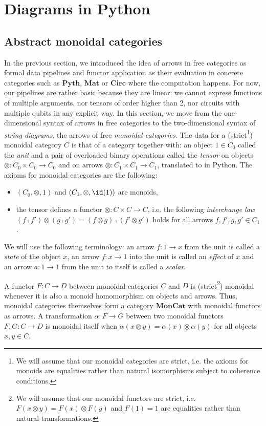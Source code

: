 
\section{Diagrams in Python}

\subsection{Abstract monoidal categories}

In the previous section, we introduced the idea of arrows in free categories as formal data pipelines and functor application as their evaluation in concrete categories such as $\mathbf{Pyth}$, $\mathbf{Mat}$ or $\mathbf{Circ}$ where the computation happens.
For now, our pipelines are rather basic because they are linear: we cannot express functions of multiple arguments, nor tensors of order higher than 2, nor circuits with multiple qubits in any explicit way.
In this section, we move from the one-dimensional syntax of arrows in free categories to the two-dimensional syntax of \emph{string diagrams}, the arrows of free \emph{monoidal categories}.
The data for a (strict\footnote
{We will assume that our monoidal categories are strict, i.e. the axioms for monoids are equalities rather than natural isomorphisms subject to coherence conditions.}) monoidal category $C$ is that of a category together with:
an object $1 \in C_0$ called the \emph{unit} and a pair of overloaded binary operations called the \emph{tensor} on objects $\otimes : C_0 \times C_0 \to C_0$ and on arrows $\otimes : C_1 \times C_1 \to C_1$, translated to  in Python.
The axioms for monoidal categories are the following:
\begin{itemize}
\item $(C_0, \otimes, 1)$ and $(C_1, \otimes, \id(1))$ are monoids,
\item the tensor defines a functor $\otimes : C \times C \to C$, i.e. the following \emph{interchange law} $(f \fcmp f') \otimes (g \fcmp g') = (f \otimes g) \fcmp (f' \otimes g')$ holds for all arrows $f, f', g, g' \in C_1$.
\end{itemize}
We will use the following terminology: an arrow $f : 1 \to x$ from the unit is called a \emph{state} of the object $x$, an arrow $f : x \to 1$ into the unit is called an \emph{effect} of $x$ and an arrow $a : 1 \to 1$ from the unit to itself is called a \emph{scalar}.

A functor $F : C \to D$ between monoidal categories $C$ and $D$ is (strict\footnote
{We will assume that our monoidal functors are strict, i.e. $F(x \otimes y) = F(x) \otimes F(y)$ and $F(1) = 1$ are equalities rather than natural transformations.}) monoidal whenever it is also a monoid homomorphism on objects and arrows.
Thus, monoidal categories themselves form a category $\mathbf{MonCat}$ with monoidal functors as arrows.
A transformation $\alpha : F \to G$ between two monoidal functors $F, G : C \to D$ is monoidal itself when $\alpha(x \otimes y) = \alpha(x) \otimes \alpha(y)$ for all objects $x, y \in C$.

